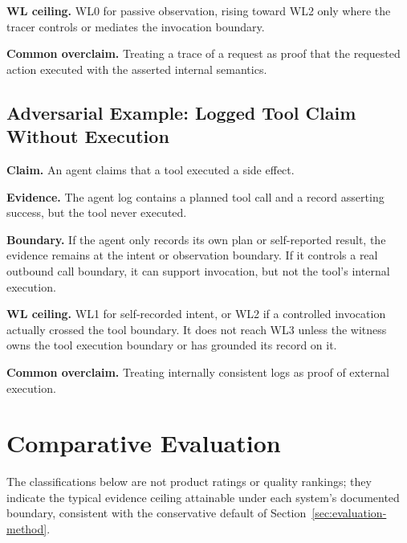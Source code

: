 \documentclass[11pt]{article}
\begin{document}
\textbf{WL ceiling.} WL0 for passive observation, rising toward WL2 only where the tracer controls or mediates the invocation boundary.

\textbf{Common overclaim.} Treating a trace of a request as proof that the requested action executed with the asserted internal semantics.

\subsection{Adversarial Example: Logged Tool Claim Without Execution}

\textbf{Claim.} An agent claims that a tool executed a side effect.

\textbf{Evidence.} The agent log contains a planned tool call and a record asserting success, but the tool never executed.

\textbf{Boundary.} If the agent only records its own plan or self-reported result, the evidence remains at the intent or observation boundary. If it controls a real outbound call boundary, it can support invocation, but not the tool's internal execution.

\textbf{WL ceiling.} WL1 for self-recorded intent, or WL2 if a controlled invocation actually crossed the tool boundary. It does not reach WL3 unless the witness owns the tool execution boundary or has grounded its record on it.

\textbf{Common overclaim.} Treating internally consistent logs as proof of external execution.

\section{Comparative Evaluation}

The classifications below are not product ratings or quality rankings; they indicate the typical evidence ceiling attainable under each system's documented boundary, consistent with the conservative default of Section~\ref{sec:evaluation-method}.
\end{document}
